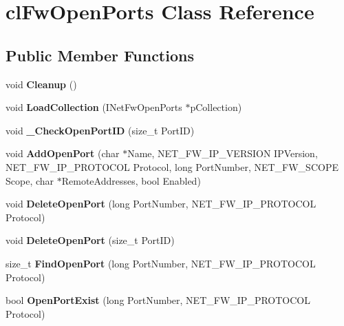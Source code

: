 \hypertarget{classcl_fw_open_ports}{
\section{clFwOpenPorts Class Reference}
\label{classcl_fw_open_ports}
}
\subsection*{Public Member Functions}
\begin{DoxyCompactItemize}
\item 
\hypertarget{classcl_fw_open_ports_ac29748bab9d6e184de2c1554072b3872}{
void {\bfseries Cleanup} ()}
\label{classcl_fw_open_ports_ac29748bab9d6e184de2c1554072b3872}

\item 
\hypertarget{classcl_fw_open_ports_a1d39b3fbd7572013ca8a0dbf48af91f4}{
void {\bfseries LoadCollection} (INetFwOpenPorts $\ast$pCollection)}
\label{classcl_fw_open_ports_a1d39b3fbd7572013ca8a0dbf48af91f4}

\item 
\hypertarget{classcl_fw_open_ports_ac12b5733ca110ecd6db9289a0790da7f}{
void {\bfseries \_\-CheckOpenPortID} (size\_\-t PortID)}
\label{classcl_fw_open_ports_ac12b5733ca110ecd6db9289a0790da7f}

\item 
\hypertarget{classcl_fw_open_ports_adaef4ff6bc91b5420367e3e70750aa18}{
void {\bfseries AddOpenPort} (char $\ast$Name, NET\_\-FW\_\-IP\_\-VERSION IPVersion, NET\_\-FW\_\-IP\_\-PROTOCOL Protocol, long PortNumber, NET\_\-FW\_\-SCOPE Scope, char $\ast$RemoteAddresses, bool Enabled)}
\label{classcl_fw_open_ports_adaef4ff6bc91b5420367e3e70750aa18}

\item 
\hypertarget{classcl_fw_open_ports_a3f9595949f2faa226426263cf3e33ef8}{
void {\bfseries DeleteOpenPort} (long PortNumber, NET\_\-FW\_\-IP\_\-PROTOCOL Protocol)}
\label{classcl_fw_open_ports_a3f9595949f2faa226426263cf3e33ef8}

\item 
\hypertarget{classcl_fw_open_ports_a1ca48655e855893f304322241cc9aaf6}{
void {\bfseries DeleteOpenPort} (size\_\-t PortID)}
\label{classcl_fw_open_ports_a1ca48655e855893f304322241cc9aaf6}

\item 
\hypertarget{classcl_fw_open_ports_ac706aa87a8c5dee64e7689a8cc96727b}{
size\_\-t {\bfseries FindOpenPort} (long PortNumber, NET\_\-FW\_\-IP\_\-PROTOCOL Protocol)}
\label{classcl_fw_open_ports_ac706aa87a8c5dee64e7689a8cc96727b}

\item 
\hypertarget{classcl_fw_open_ports_a5a06008a4e7573b959d5f738088dbc5f}{
bool {\bfseries OpenPortExist} (long PortNumber, NET\_\-FW\_\-IP\_\-PROTOCOL Protocol)}
\label{classcl_fw_open_ports_a5a06008a4e7573b959d5f738088dbc5f}

\end{DoxyCompactItemize}
